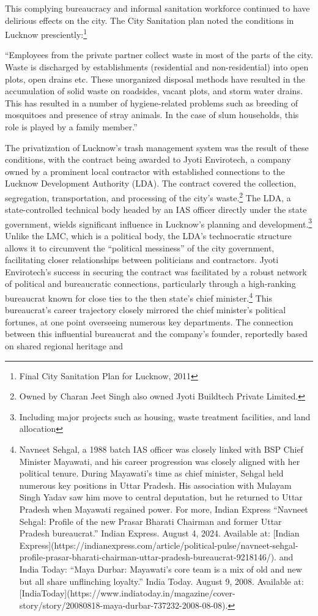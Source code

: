 This complying bureaucracy and informal sanitation workforce continued to have delirious effects on the city. The City Sanitation plan noted the conditions in Lucknow presciently:\footnote{Final City Sanitation Plan for Lucknow, 2011}

``Employees from the private partner collect waste in most of the parts of the city. Waste is discharged by establishments (residential and non-residential) into open plots, open drains etc. These unorganized disposal methods have resulted in the accumulation of solid waste on roadsides, vacant plots, and storm water drains. This has resulted in a number of hygiene-related problems such as breeding of mosquitoes and presence of stray animals. In the case of slum households, this role is played by a family member.''

The privatization of Lucknow's trash management system was the result of these conditions, with the contract being awarded to Jyoti Envirotech, a company owned by a prominent local contractor with established connections to the Lucknow Development Authority (LDA). The contract covered the collection, segregation, transportation, and processing of the city's waste.\footnote{Owned by Charan Jeet Singh also owned Jyoti Buildtech Private Limited.} The LDA, a state-controlled technical body headed by an IAS officer directly under the state government, wields significant influence in Lucknow's planning and development.\footnote{Including major projects such as housing, waste treatment facilities, and land allocation} Unlike the LMC, which is a political body, the LDA's technocratic structure allows it to circumvent the ``political messiness'' of the city government, facilitating closer relationships between politicians and contractors. Jyoti Envirotech's success in securing the contract was facilitated by a robust network of political and bureaucratic connections, particularly through a high-ranking bureaucrat known for close ties to the then state's chief minister.\footnote{Navneet Sehgal, a 1988 batch IAS officer was closely linked with BSP Chief Minister Mayawati, and his career progression was closely aligned with her political tenure. During Mayawati's time as chief minister, Sehgal held numerous key positions in Uttar Pradesh. His association with Mulayam Singh Yadav saw him move to central deputation, but he returned to Uttar Pradesh when Mayawati regained power. For more, Indian Express ``Navneet Sehgal: Profile of the new Prasar Bharati Chairman and former Uttar Pradesh bureaucrat.'' Indian Express. August 4, 2024. Available at: [Indian Express](https://indianexpress.com/article/political-pulse/navneet-sehgal-profile-prasar-bharati-chairman-uttar-pradesh-bureaucrat-9218146/). and India Today: ``Maya Durbar: Mayawati's core team is a mix of old and new but all share unflinching loyalty.'' India Today. August 9, 2008. Available at: [IndiaToday](https://www.indiatoday.in/magazine/cover-story/story/20080818-maya-durbar-737232-2008-08-08).} This bureaucrat's career trajectory closely mirrored the chief minister's political fortunes, at one point overseeing numerous key departments. The connection between this influential bureaucrat and the company's founder, reportedly based on shared regional heritage and 